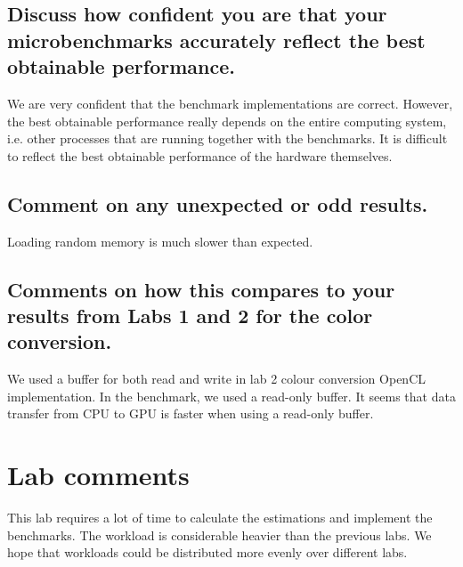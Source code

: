 \documentclass{article}
\begin{document}
\subsection{Discuss how confident you are that your microbenchmarks
  accurately reflect the best obtainable performance.}
We are very confident that the benchmark implementations are correct.
However, the best obtainable performance really depends on the entire
computing system, i.e. other processes that are running together with
the benchmarks. It is difficult to reflect the best obtainable
performance of the hardware themselves.

\subsection{Comment on any unexpected or odd results.}
Loading random memory is much slower than expected.

\subsection{Comments on how this compares to your results from Labs 1
  and 2 for the color conversion.}
We used a buffer for both read and write in lab 2 colour conversion
OpenCL implementation. In the benchmark, we used a read-only buffer.
It seems that data transfer from CPU to GPU is faster when using a
read-only buffer.

\section{Lab comments}
This lab requires a lot of time to calculate the estimations and
implement the benchmarks. The workload is considerable heavier than the
previous labs. We hope that workloads could be distributed more evenly
over different labs.
\end{document}
